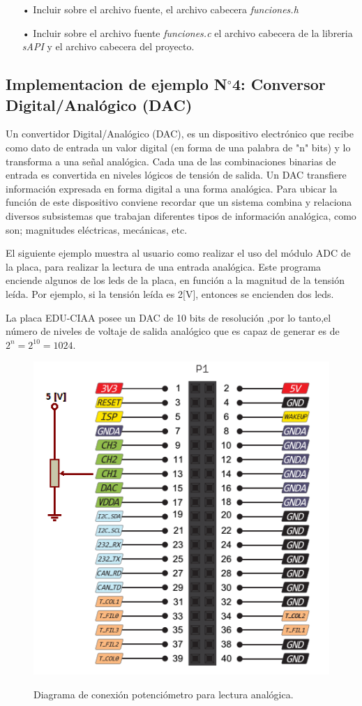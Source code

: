 \documentclass[12pt,letterpaper]{article}
\begin{document}
\begin{enumerate}
\item[•] Incluir sobre el archivo fuente, el archivo cabecera \textit{funciones.h}

\item[•] Incluir sobre el archivo fuente \textit{funciones.c} el archivo cabecera de la libreria \textit{sAPI} y el archivo cabecera del proyecto.

\end{enumerate}

\subsection{Implementacion de ejemplo N$^{\circ}$4: Conversor Digital/Analógico (DAC)}\label{sec:ej4sapi}

Un convertidor Digital/Analógico (DAC), es un dispositivo electrónico que recibe como dato de entrada un valor digital (en forma de una palabra de "n" bits) y lo transforma a una señal analógica. Cada una de las combinaciones binarias de entrada es convertida en niveles lógicos de tensión de salida. Un DAC transfiere información expresada en forma digital a una forma analógica. Para ubicar la función de este dispositivo conviene recordar que un sistema combina y relaciona diversos subsistemas que trabajan diferentes tipos de información analógica, como son; magnitudes eléctricas, mecánicas, etc.

El siguiente ejemplo muestra al usuario como realizar el uso del módulo ADC de la placa, para realizar la lectura de una entrada analógica. Este programa enciende algunos de los leds de la placa, en función a la magnitud de la tensión leída. Por ejemplo, si la tensión leída es 2[V], entonces se encienden dos leds.

La placa EDU-CIAA posee un DAC de 10 bits de resolución ,por lo tanto,el número de niveles de voltaje de salida analógico que es capaz de generar es de $2^{n}=2^{10}=1024$.

\begin{figure}[!h]
\centering
\includegraphics[width=6 cm]{figuras/f6.png}\\
\caption{Diagrama de conexión potenciómetro para lectura analógica.}
\label{Fig24}
\end{figure}
\end{document}
